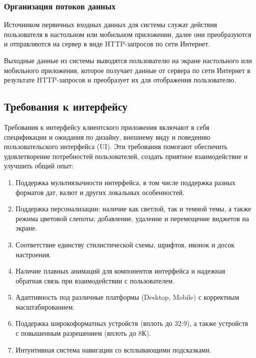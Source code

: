 \documentclass[a4paper,14pt]{extarticle}
\begin{document}
\begin{spacing}{1.5}
\subsubsection{Организация потоков данных}

\hspace{\parindent} Источником первичных входных данных для системы служат действия пользователя в настольном или мобильном приложении, далее они преобразуются и отправляются на сервер в виде HTTP-запросов по сети Интернет.

Выходные данные из системы выводятся пользователю на экране настольного или мобильного приложения, которое получает данные от сервера по сети Интернет в результате HTTP-запросов и преобразует их для отображения пользователю.

\clearpage

\subsection{Требования к интерфейсу}
\hspace{\parindent} Требования к интерфейсу клиентского приложения включают в себя спецификации и ожидания по дизайну, внешнему виду и поведению пользовательского интерфейса (UI). Эти требования помогают обеспечить удовлетворение потребностей пользователей, создать приятное взаимодействие и улучшить общий опыт: 
\begin{enumerate}[label*=\arabic*.]
        \item Поддержка мультиязычности интерфейса, в том числе поддержка разных форматов дат, валют и других локальных особенностей.
        \item Поддержка персонализации: наличие как светлой, так и темной темы, а также режима цветовой слепоты; добавление, удаление и перемещение виджетов на экране.
        \item Соответствие единству стилистической схемы, шрифтов, иконок и досок настроения.
        \item Наличие плавных анимаций для компонентов интерфейса и надежная обратная связь при взаимодействии с пользователем.
        \item Адаптивность под различные платформы (Desktop, Mobile) с корректным масштабированием.
        \item Поддержка широкоформатных устройств (вплоть до 32:9), а также устройств с повышенным разрешением (вплоть до 8К).
        \item Интуитивная система навигации со всплывающими подсказками.
\end{enumerate}


\end{spacing}
\end{document}
